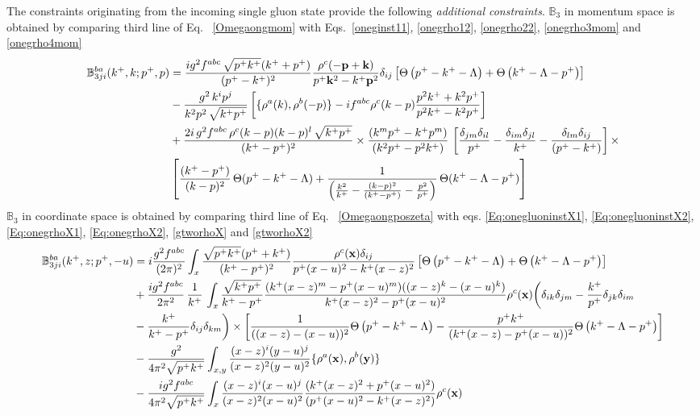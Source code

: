 \documentclass[aps,prd,amsmath,amssymb,nofootinbib]{revtex4-2}
\def\mf#1{\mathbb{#1}}
\def\v#1{\mathbf{#1}}
\numberwithin{equation}{section}
\begin{document}
The constraints originating from the incoming single gluon state provide the following {\it additional constraints}. $\mf{B}_{3}$ in momentum space is obtained by comparing third line of Eq.~ \eqref{Omegaongmom} with Eqs.~\eqref{oneginst11}, \eqref{onegrho12}, \eqref{onegrho22}, \eqref{onegrho3mom} and \eqref{onegrho4mom} 
\begin{align}
    \mf{B}^{ba}_{3ji}(k^{+},k; p^{+},p) & =  \frac{ig^2 f^{abc}\,\sqrt{p^{+}k^{+}} (k^++p^+) } {(p^+-k^+)^2} \frac{\rho^c(-\v{p}+\v{k})}{p^{+}\v{k}^2 - k^{+}\v{p}^2} \delta_{ij}\left[\Theta\left(p^{+} - k^{+} - \Lambda\right)+\Theta\left(k^{+}-\Lambda-p^{+}\right)\right]\notag \\ & -\frac{g^{2}\,k^{i}p^{j}}{k^{2}p^{2}\,\sqrt{k^{+}p^{+}}}\left[\{\rho^{a}(k),\rho^{b}(-p)\}-if^{abc}\rho^{c}(k-p)\frac{p^{2}k^{+}+k^{2}p^{+}}{p^{2}k^{+}-k^{2}p^{+}}\right]\notag \\ & +\frac{2i\,g^{2}f^{abc}\,\rho^{c}(k-p)(k-p)^{l}\,\sqrt{k^{+}p^{+}}}{(k^{+}-p^{+})^{2}}\times \frac{\left(k^{m}p^{+}-k^{+}p^{m}\right)}{\left(k^{2}p^{+}-p^{2}k^{+}\right)}\,\left[\frac{\delta_{jm}\delta_{il}}{p^{+}}-\frac{\delta_{im}\delta_{jl}}{k^{+}}-\frac{\delta_{lm}\delta_{ij}}{(p^{+}-k^{+})}\right]\times \notag \\ & \left[\frac{(k^{+}-p^{+})}{(k-p)^{2}}\,\Theta(p^{+}-k^{+}-\Lambda)+\frac{1}{\left(\frac{k^{2}}{k^{+}}-\frac{(k-p)^{2}}{(k^{+}-p^{+})}-\frac{p^{2}}{p^{+}}\right)}\,\Theta(k^{+}-\Lambda-p^{+})\right]
\end{align}
$\mf{B}_{3}$ in coordinate space is obtained by comparing third line of Eq.~ \eqref{Omegaongposzeta} with eqs. \eqref{Eq:onegluoninstX1}, \eqref{Eq:onegluoninstX2}, \eqref{Eq:onegrhoX1}, \eqref{Eq:onegrhoX2}, \eqref{gtworhoX} and \eqref{gtworhoX2}
\begin{align}
   \mf{B}^{ba}_{3ji}(k^+, z;p^+, -u) & = i \frac{g^2 f^{abc}}{(2\pi)^{2}} \int_{x} %
   \frac{\sqrt{p^{+}k^{+}}(p^{+}+k^{+})} {(k^{+}-p^{+})^2} \frac{\rho^c(\v{x}) \delta_{ij}}{p^{+}(x-u)^{2} - k^{+}(x-z)^{2} }\left[\Theta\left(p^{+} - k^{+} - \Lambda \right)+\Theta\left(k^{+}-\Lambda-p^{+}\right)\right]  \notag \\ & + \frac{ig^2 f^{abc}} {2\pi^{2} } \,\frac{1}{k^{+}}\, 
   \int_{x}  
   \frac{\sqrt{k^{+}p^{+}}}{k^{+}-p^{+}} 
   \frac{(k^{+}(x-z)^{m} - p^{+} (x-u)^m)((x-z)^{k} -  (x-u)^{k})} {k^{+}(x-z)^{2} - p^{+} (x-u)^2}
   \rho^c(\v{x}) \bigg( 
  \delta_{ik} \delta_{jm}
  - \frac{k^{+}}{p^{+}}\delta_{jk} \delta_{im}
 \notag \\ &  - \frac{k^{+}}{k^{+}-p^{+}}\delta_{ij} \delta_{km}
   \bigg)\times\left[\frac{1}{((x-z) -  (x-u))^2}\Theta\left(p^{+} - k^{+} - \Lambda \right)-\frac{p^{+}k^{+}}{(k^{+}(x-z) -  p^{+} (x-u))^2} \Theta\left(k^{+}-\Lambda-p^{+}\right)\right]\notag \\ & -\frac{g^{2}}{4\pi^{2} \sqrt{p^{+}k^{+}}}\int_{x,y}\frac{(x-z)^{i} (y-u)^{j}}{(x-z)^{ 2}(y-u)^{2}}\{\rho^{a}(\v{x}),\rho^{b}(\v{y})\} \notag \\ &  -\frac{ig^{2}f^{abc}}{4\pi^{2} \sqrt{p^{+}k^{+}}} \int_{x}\frac{(x-z)^{i}(x-u)^{j}}{(x-z)^{2}(x-u)^{2}}\frac{(k^{+}(x-z)^{2} +p^{+} (x-u)^{2})}{(p^{+} (x-u)^{2}-k^{+}(x-z)^{2})}\rho^{c}(\v{x})
\end{align}
\end{document}
